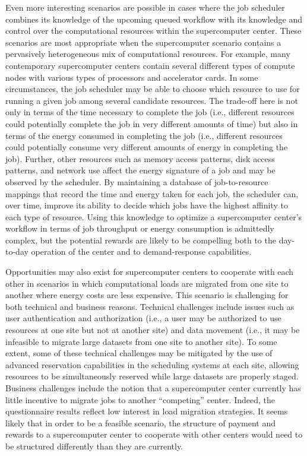 Even more interesting scenarios are possible in cases where the job
scheduler combines its knowledge of the upcoming queued workflow with
its knowledge and control over the computational resources within the
supercomputer center.  These scenarios are most appropriate when the
supercomputer scenario contains a pervasively heterogeneous mix of
computational resources.  For example, many contemporary supercomputer
centers contain several different types of compute nodes with various
types of processors and accelerator cards.  In some circumstances, the
job scheduler may be able to choose which resource to use for running
a given job among several candidate resources.  The trade-off here is
not only in terms of the time necessary to complete the job (i.e.,
different resources could potentially complete the job in very
different amounts of time) but also in terms of the energy consumed in
completing the job (i.e., different resources could potentially
consume very different amounts of energy in completing the job).
Further, other resources such as memory access patterns, disk access
patterns, and network use affect the energy signature of a job and may
be observed by the scheduler.  By maintaining a database of
job-to-resource mappings that record the time and energy taken for
each job, the scheduler can, over time, improve its ability to decide
which jobs have the highest affinity to each type of resource.  Using
this knowledge to optimize a supercomputer center's workflow in terms
of job throughput or energy consumption is admittedly complex, but the
potential rewards are likely to be compelling both to the day-to-day
operation of the center and to demand-response capabilities.

Opportunities may also exist for supercomputer centers to cooperate
with each other in scenarios in which computational loads are migrated
from one site to another where energy costs are less expensive.  This
scenario is challenging for both technical and business reasons.
Technical challenges include issues such as user authentication and
authorization (i.e., a user may be authorized to use resources at one
site but not at another site) and data movement (i.e., it may be
infeasible to migrate large datasets from one site to another site).
To some extent, some of these technical challenges may be mitigated by
the use of advanced reservation capabilities in the scheduling systems
at each site, allowing resources to be simultaneously reserved while
large datasets are properly staged.  Business challenges include the
notion that a supercomputer center currently has little incentive to
migrate jobs to another ``competing'' center.  Indeed, the
questionnaire results reflect low interest in load migration
strategies.  It seems likely that in order to be a feasible scenario,
the structure of payment and rewards to a supercomputer center to
cooperate with other centers would need to be structured differently
than they are currently.

